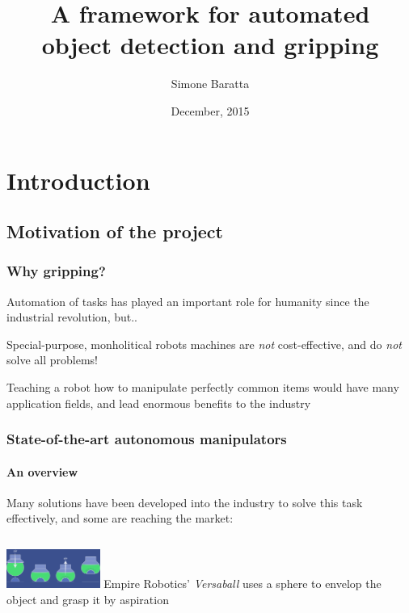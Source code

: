 \documentclass{beamer}
\title{A framework for automated\\object detection and gripping}
\author{Simone Baratta}
\institute{Dipartimento di Automatica e Informatica\\Politecnico di Torino}
\date{December, 2015}
\begin{document}
  \watermarkoff
  \begin{frame}
    \titlepage
  \end{frame}
  \watermarkon
  \section{Introduction}
  \subsection{Motivation of the project}
  \begin{frame}
    \frametitle{Why gripping?}
    Automation of tasks has played an important role for humanity
    since the industrial revolution, but..

    \pause
    Special-purpose, monholitical robots machines are \emph{not}
    cost-effective, and do \emph{not} solve all problems!
    
    \pause
    Teaching a robot how to manipulate perfectly common
    items would have many application fields, and lead enormous
    benefits to the industry
  \end{frame}
  \begin{frame}
    \frametitle{State-of-the-art autonomous manipulators}
    \framesubtitle{An overview}
    Many solutions have been developed into the industry to solve this 
    task effectively, and some are reaching the market:

    {\begin{columns}[c]
      \center \includegraphics[height=0.5in]{versaball}
         Empire Robotics' \emph{Versaball} uses a sphere to
        envelop the object and grasp it by aspiration
    \end{columns}}
  \end{frame}
\end{document}
